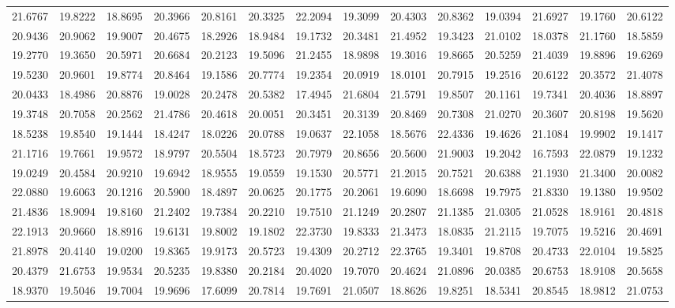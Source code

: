 \documentclass[12pt]{article}\usepackage[]{graphicx}\usepackage[]{color}
\begin{document}
\begin{landscape}
\begin{longtable}[t]{rrrrrrrrrrrrrr}
21.6767 & 19.8222 & 18.8695 & 20.3966 & 20.8161 & 20.3325 & 22.2094 & 19.3099 & 20.4303 & 20.8362 & 19.0394 & 21.6927 & 19.1760 & 20.6122\\
20.9436 & 20.9062 & 19.9007 & 20.4675 & 18.2926 & 18.9484 & 19.1732 & 20.3481 & 21.4952 & 19.3423 & 21.0102 & 18.0378 & 21.1760 & 18.5859\\
19.2770 & 19.3650 & 20.5971 & 20.6684 & 20.2123 & 19.5096 & 21.2455 & 18.9898 & 19.3016 & 19.8665 & 20.5259 & 21.4039 & 19.8896 & 19.6269\\
19.5230 & 20.9601 & 19.8774 & 20.8464 & 19.1586 & 20.7774 & 19.2354 & 20.0919 & 18.0101 & 20.7915 & 19.2516 & 20.6122 & 20.3572 & 21.4078\\
20.0433 & 18.4986 & 20.8876 & 19.0028 & 20.2478 & 20.5382 & 17.4945 & 21.6804 & 21.5791 & 19.8507 & 20.1161 & 19.7341 & 20.4036 & 18.8897\\
19.3748 & 20.7058 & 20.2562 & 21.4786 & 20.4618 & 20.0051 & 20.3451 & 20.3139 & 20.8469 & 20.7308 & 21.0270 & 20.3607 & 20.8198 & 19.5620\\
18.5238 & 19.8540 & 19.1444 & 18.4247 & 18.0226 & 20.0788 & 19.0637 & 22.1058 & 18.5676 & 22.4336 & 19.4626 & 21.1084 & 19.9902 & 19.1417\\
21.1716 & 19.7661 & 19.9572 & 18.9797 & 20.5504 & 18.5723 & 20.7979 & 20.8656 & 20.5600 & 21.9003 & 19.2042 & 16.7593 & 22.0879 & 19.1232\\
19.0249 & 20.4584 & 20.9210 & 19.6942 & 18.9555 & 19.0559 & 19.1530 & 20.5771 & 21.2015 & 20.7521 & 20.6388 & 21.1930 & 21.3400 & 20.0082\\
22.0880 & 19.6063 & 20.1216 & 20.5900 & 18.4897 & 20.0625 & 20.1775 & 20.2061 & 19.6090 & 18.6698 & 19.7975 & 21.8330 & 19.1380 & 19.9502\\
21.4836 & 18.9094 & 19.8160 & 21.2402 & 19.7384 & 20.2210 & 19.7510 & 21.1249 & 20.2807 & 21.1385 & 21.0305 & 21.0528 & 18.9161 & 20.4818\\
22.1913 & 20.9660 & 18.8916 & 19.6131 & 19.8002 & 19.1802 & 22.3730 & 19.8333 & 21.3473 & 18.0835 & 21.2115 & 19.7075 & 19.5216 & 20.4691\\
21.8978 & 20.4140 & 19.0200 & 19.8365 & 19.9173 & 20.5723 & 19.4309 & 20.2712 & 22.3765 & 19.3401 & 19.8708 & 20.4733 & 22.0104 & 19.5825\\
20.4379 & 21.6753 & 19.9534 & 20.5235 & 19.8380 & 20.2184 & 20.4020 & 19.7070 & 20.4624 & 21.0896 & 20.0385 & 20.6753 & 18.9108 & 20.5658\\
18.9370 & 19.5046 & 19.7004 & 19.9696 & 17.6099 & 20.7814 & 19.7691 & 21.0507 & 18.8626 & 19.8251 & 18.5341 & 20.8545 & 18.9812 & 21.0753\\

\end{longtable}
\end{landscape}
\end{document}
